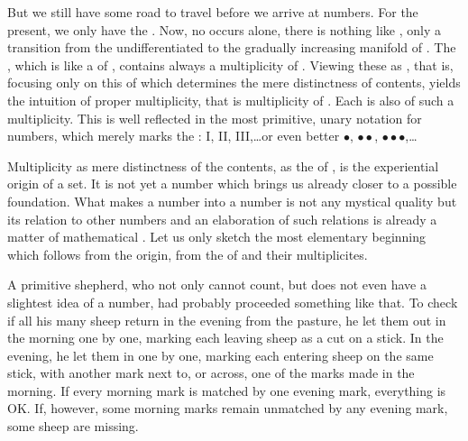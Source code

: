 \pa\label{pa:numbers} But we still have some road to travel before we arrive at
numbers.  For the present, we only have the . Now, no
 occurs alone, there is nothing like , only a transition from the undifferentiated  to the
gradually increasing manifold of . The \hoa, which is like a
 of , contains always a multiplicity of
. Viewing these as , that is, focusing
only on this  of  which determines the mere
distinctness of  contents, yields the intuition of proper
multiplicity, that is multiplicity of . Each  is also  of such a multiplicity. This is well
reflected in the most primitive, unary notation for numbers, which merely marks
the : I, II, III,\ldots or even better $\bullet$,
$\bullet\bullet$, $\bullet\bullet\bullet$,\ldots

Multiplicity as mere distinctness of the  contents, as the
   of , is the experiential
origin of a set. It is not yet a number which brings us already closer to a
possible foundation.  What makes a number into a number is not any mystical
quality but its relation to other numbers
and an elaboration of such relations is already a matter of mathematical
.  Let us only sketch the most elementary beginning which follows
from the origin, from the  of  and their
multiplicites.

A primitive shepherd, who not only cannot count, but does not even have a
slightest idea of a number, had probably proceeded something like that.  To
check if all his many sheep return in the evening from the pasture, he let them
out in the morning one by one, marking each leaving sheep as a cut on a stick.
In the evening, he let them in one by one, marking each entering sheep on the
same stick, with another mark next to, or across, one of the marks made in the
morning.  If every morning mark is matched by one evening mark, everything is
OK.  If, however, some morning marks remain unmatched by any evening mark, some
sheep are missing.

